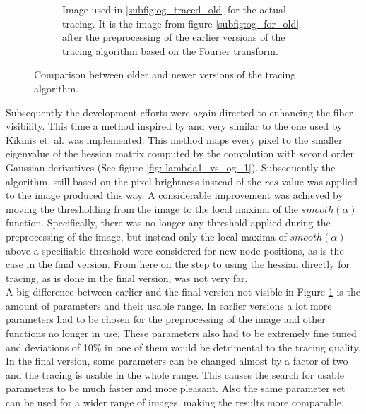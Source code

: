 \documentclass[12pt,english,twocolumn]{revtex4}
\begin{document}
\begin{figure}[t]
\begin{subfigure}[b]{.48\linewidth}
        \caption{Image used in \ref{subfig:og_traced_old} for the actual tracing. It is the image from figure \ref{subfig:og_for_old} after the preprocessing of the earlier versions of the tracing algorithm based on the Fourier transform.}
    \end{subfigure}
    \caption{Comparison between older and newer versions of the tracing algorithm.}
    \label{fig:prev_algo}
\end{figure}
Subsequently the development efforts were again directed to enhancing the fiber visibility. This time a method inspired by and very similar to the one used by Kikinis et. al. \cite{tubeness_paper} was implemented. This method maps every pixel to the smaller eigenvalue of the hessian matrix computed by the convolution with second order Gaussian derivatives (See figure \ref{fig:-lambda1_vs_og_1}). Subsequently the algorithm, still based on the pixel brightness instead of the $res$ value was applied to the image produced this way. A considerable improvement was achieved by moving the thresholding from the image to the local maxima of the $smooth(\alpha)$ function. Specifically, there was no longer any threshold applied during the preprocessing of the image, but instead only the local maxima of $smooth(\alpha)$ above a specifiable threshold were considered for new node positions, as is the case in the final version. From here on the step to using the hessian directly for tracing, as is done in the final version, was not very far.\\
A big difference between earlier and the final version not visible in Figure \ref{fig:prev_algo} is the amount of parameters and their usable range. In earlier versions a lot more parameters had to be chosen for the preprocessing of the image and other functions no longer in use. These parameters also had to be extremely fine tuned and deviations of 10\% in one of them would be detrimental to the tracing quality. In the final version, some parameters can be changed almost by a factor of two and the tracing is usable in the whole range. This causes the search for usable parameters to be much faster and more pleasant. Also the same parameter set can be used for a wider range of images, making the results more comparable.


\end{document}

